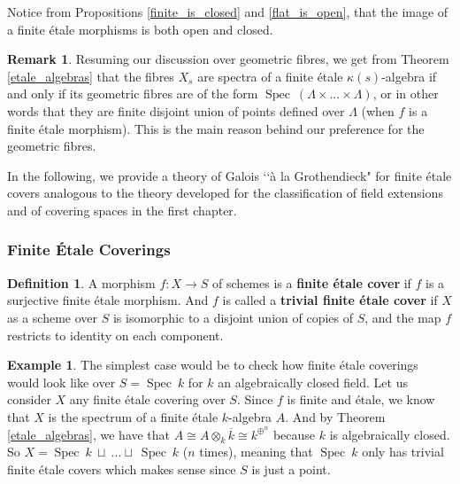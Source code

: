 \documentclass{article}
\theoremstyle{plain}
\theoremstyle{definition}
\newtheorem{definition}[theorem]{Definition}
\newtheorem{remark}{Remark}
\newtheorem{example}[theorem]{Example}
\DeclareMathOperator{\Spec}{Spec}
\begin{document}
\noindent Notice from Propositions \ref{finite_is_closed} and \ref{flat_is_open}, that the image of a finite \'etale morphisms is both open and closed.

\begin{remark}
    Resuming our discussion over geometric fibres, we get from Theorem \ref{etale_algebras} that the fibres $X_s$ are spectra of a finite \'etale $\kappa(s)$-algebra if and only if its geometric fibres are of the form $\Spec\:(\Lambda \times ...\times \Lambda)$, or in other words that they are finite disjoint union of points defined over $\Lambda$ (when $f$ is a finite \'etale morphism).
This is the main reason behind our preference for the geometric fibres.
\end{remark}


\noindent In the following, we provide a theory of Galois ‘‘\`a la Grothendieck" for finite \'etale covers analogous to the theory developed for the classification of field extensions and of covering spaces in the first chapter. 

\subsubsection{Finite \'Etale Coverings}
\label{finite_etale_coverings}



\begin{definition}
    A morphism $f:X\rightarrow S$ of schemes is a \textbf{finite \'etale cover} if $f$ is a surjective finite \'etale morphism. 
    And $f$ is called a \textbf{trivial finite \'etale cover} if $X$ as a scheme over $S$ is isomorphic to a disjoint union of copies of $S$, and the map $f$ restricts to identity on each component.
\end{definition}

\begin{example}
    The simplest case would be to check how finite \'etale coverings would look like over $S=\Spec\:k$ for $k$ an algebraically closed field.
    Let us consider $X$ any finite \'etale covering over $S$. Since $f$ is finite and \'etale, we know that $X$ is the spectrum of a finite \'etale $k$-algebra $A$. 
    And by Theorem \ref{etale_algebras}, we have that $A \cong A\otimes_k\overline{k} \cong k^{\oplus^n}$ because $k$ is algebraically closed.
    So $X = \Spec\:k\: \sqcup \:...\sqcup\:\Spec\:k$ ($n$ times), meaning that $\Spec\:k$ only has trivial finite \'etale covers which makes sense since $S$ is just a point. 
\end{example}
\end{document}
